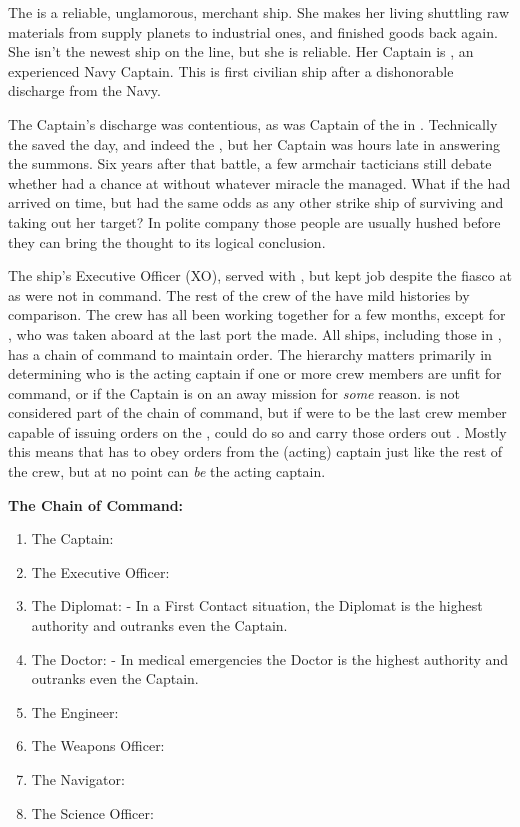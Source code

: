 \documentclass[blue]{TMFHope}
\begin{document}
\name{\bHope{}}

The \pNew{} is a reliable, unglamorous, merchant ship. She makes her living shuttling raw materials from supply planets to industrial ones, and finished goods back again. She isn't the newest ship on the line, but she is reliable. Her Captain is \cCap{}, an experienced Navy Captain. This is \cCap{\their} first civilian ship after a dishonorable discharge from the Navy.  

The Captain's discharge was contentious, as \cCap{} was Captain of the \pOld{} in \pBattle{}. Technically the \pOld{} saved the day, and indeed the \pPlan{}, but her Captain was hours late in answering the summons. Six years after that battle, a few armchair tacticians still debate whether \pPlan{} had a chance at \pHome{} without whatever miracle the \pOld{} managed. What if the \pOld{} had arrived on time, but had the same odds as any other strike ship of surviving and taking out her target? In polite company those people are usually hushed before they can bring the thought to its logical conclusion.

The ship's Executive Officer (XO), \cXO{} served with \cCap{}, but kept \cXO{\their} job despite the fiasco at \pBattle{} as \cXO{\the} were not in command. The rest of the crew of the \pNew{} have mild histories by comparison. The crew has all been working together for a few months, except for \cBoy{}, who was taken aboard at the last port the \pNew{} made. All ships, including those in \pTMF{}, has a chain of command to maintain order. The hierarchy matters primarily in determining who is the acting captain if one or more crew members are unfit for command, or if the Captain is on an away mission for \emph{some} reason. \cBoy{} is not considered part of the chain of command, but if \cBoy{\they} were to be the last crew member capable of issuing orders on the \pNew{}, \cBoy{\they} could do so and carry those orders out \cBoy{\themself}. Mostly this means that \cBoy{} has to obey orders from the (acting) captain just like the rest of the crew, but at no point can \cBoy{} \emph{be} the acting captain.

{\bf The \pNew{} Chain of Command:}
\begin{enumerate}
  \item The Captain: \cCap{}
	\item The Executive Officer: \cXO{}
	\item The Diplomat: \cDip{} - In a First Contact situation, the Diplomat is the highest authority and outranks even the Captain.
	\item The Doctor: \cMed{} - In medical emergencies the Doctor is the highest authority and outranks even the Captain.
	\item The Engineer: \cEng{}
	\item The Weapons Officer: \cWeap{}
	\item The Navigator: \cNav{}
	\item The Science Officer: \cSci{}
\end{enumerate}
\end{document}
